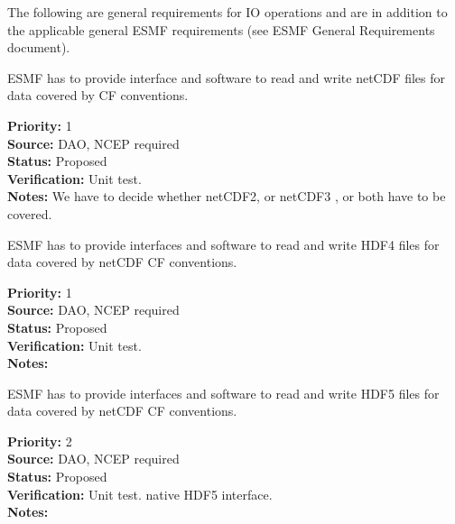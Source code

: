 

The following are general requirements for IO operations and are in
addition to the applicable general ESMF requirements (see ESMF General 
Requirements document).





ESMF has to provide interface and software to read and write netCDF
files for data covered by CF conventions. 

\begin{reqlist}
{\bf Priority:} 1 \\
{\bf Source:} DAO, NCEP required \\
{\bf Status:} Proposed \\
{\bf Verification:} Unit test. \\
{\bf Notes:} We have to decide whether netCDF2, or netCDF3 , or both
have to be covered.
\end{reqlist}


ESMF has to provide interfaces and software to read and write HDF4
files for data covered by netCDF CF conventions. 

\begin{reqlist}
{\bf Priority:} 1 \\
{\bf Source:} DAO, NCEP required \\
{\bf Status:} Proposed \\
{\bf Verification:} Unit test. \\
{\bf Notes:}
\end{reqlist}


ESMF has to provide interfaces and software to read and write HDF5
files for data covered by netCDF CF conventions. 

\begin{reqlist}
{\bf Priority:} 2 \\
{\bf Source:} DAO, NCEP required \\
{\bf Status:} Proposed \\
{\bf Verification:} Unit test. 
native HDF5 interface. \\
{\bf Notes:}
\end{reqlist}

